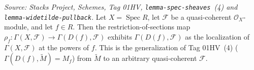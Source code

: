 \begin{lemma}\label{mk-lem:qcoh_section_isLocalizedModule}
  \leanok

  \textit{Source: Stacks Project, Schemes, Tag 01HV, \texttt{lemma-spec-sheaves}~(4) and
  \texttt{lemma-widetilde-pullback}.}
  Let \(X = \operatorname{Spec} R\), let \(\mathcal{F}\) be a quasi-coherent
  \(\mathcal{O}_X\)-module, and let \(f \in R\). Then the restriction-of-sections map
  \(\rho_f : \Gamma(X, \mathcal{F}) \to \Gamma(D(f), \mathcal{F})\) exhibits
  \(\Gamma(D(f), \mathcal{F})\) as the localization of \(\Gamma(X, \mathcal{F})\) at the powers of
  \(f\). This is the
  generalization of Tag 01HV~(4) (\(\Gamma(D(f), \widetilde{M}) = M_f\)) from \(\widetilde{M}\) to an
  arbitrary quasi-coherent \(\mathcal{F}\).
\end{lemma}
